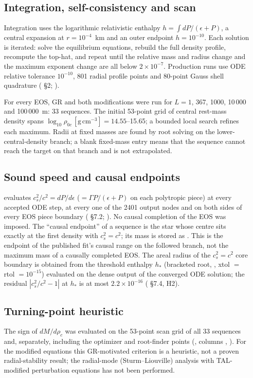 \documentclass[11pt,a4paper]{article}
\newcommand{\ee}[2]{#1\times10^{#2}}
\begin{document}
\subsection{Integration, self-consistency and scan}
Integration uses the logarithmic relativistic enthalpy $h=\int dP/(\epsilon+P)$, a central expansion at
$r=10^{-4}$~km and an outer endpoint $h=10^{-10}$. Each solution is iterated: solve the equilibrium
equations, rebuild the full density profile, recompute the top-hat, and repeat until the relative mass and
radius change and the maximum exponent change are all below $\ee{2}{-7}$. Production runs use ODE relative
tolerance $10^{-10}$, 801 radial profile points and 80-point Gauss shell quadrature
( \S2; ).

For every EOS, GR and both modifications were run for $L=1$, 367, 1000, 10\,000 and 100\,000~m: 33
sequences. The initial 53-point grid of central rest-mass density spans
$\log_{10}\rho_{0c}\,[\mathrm{g\,cm^{-3}}]=14.55$--15.65; a bounded local search refines each maximum.
Radii at fixed masses are found by root solving on the lower-central-density branch; a blank fixed-mass
entry means that the sequence cannot reach the target on that branch and is not extrapolated.

\subsection{Sound speed and causal endpoints}
 evaluates $c_s^2/c^2=dP/d\epsilon$ ($=\Gamma P/(\epsilon+P)$ on each polytropic piece)
at every accepted ODE step, at every one of the 2401 output nodes and on both sides of every EOS piece
boundary ( \S7.2; ). No causal completion of the EOS
was imposed. The ``causal endpoint'' of a sequence is the star whose centre sits exactly at the first
density with $c_s^2=c^2$; its mass is stored as . This is the endpoint of the
published fit's causal range on the followed branch, not the maximum mass of a causally completed EOS. The
areal radius of the $c_s^2=c^2$ core boundary is obtained from the threshold enthalpy $h_*$ (bracketed root,
, xtol $=$ rtol $=10^{-15}$) evaluated on the dense output of the converged ODE solution;
the residual $|c_s^2/c^2-1|$ at $h_*$ is at most $\ee{2.2}{-16}$ ( \S7.4, H2).

\subsection{Turning-point heuristic}
The sign of $dM/d\rho_c$ was evaluated on the 53-point scan grid of all 33 sequences and, separately,
including the optimizer and root-finder points (, columns
, ). For the modified equations
this GR-motivated criterion is a heuristic, not a proven radial-stability result; the radial-mode
(Sturm--Liouville) analysis with TAL-modified perturbation equations has not been performed.
\end{document}
